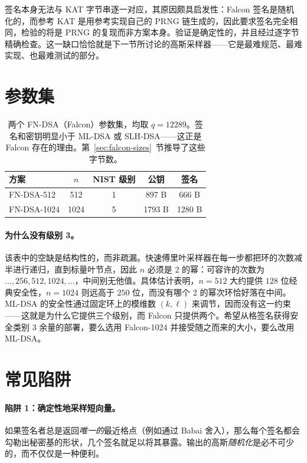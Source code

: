 签名本身无法与 KAT 字节串逐一对应，其原因颇具启发性：Falcon 签名是随机化的，而参考 KAT 是用参考实现自己的 PRNG 链生成的，因此要求签名完全相同，检验的将是 PRNG 的复现而非方案本身。验证是确定性的，并且经过逐字节精确检查。这一缺口恰恰就是下一节所讨论的高斯采样器——它是最难规范、最难实现、也最难测试的部分。

\section{参数集}
\label{sec:falcon-params}

\begin{table}[H]
\centering
\begin{tabular}{lcccc}
\toprule
方案 & $n$ & NIST 级别 & 公钥 & 签名 \\
\midrule
FN-DSA-512  & 512  & 1 & 897 B & 666 B \\
FN-DSA-1024 & 1024 & 5 & 1793 B & 1280 B \\
\bottomrule
\end{tabular}
\caption{两个 FN-DSA（Falcon）参数集，均取 $q=12289$。签名和密钥明显小于 ML-DSA 或 SLH-DSA——这正是 Falcon 存在的理由。第~\ref{sec:falcon-sizes}~节推导了这些字节数。}
\end{table}

\paragraph{为什么没有级别 3。}
该表中的空缺是结构性的，而非疏漏。快速傅里叶采样器在每一步都把环的次数减半进行递归，直到标量叶节点，因此 $n$
必须是 2 的幂：可容许的次数为 $\dots, 256, 512, 1024,
\dots$，中间别无他值。具体估计表明，$n=512$ 大约提供 $128$
位经典安全性，$n=1024$ 则远高于 $250$ 位，而没有哪个 2 的幂次环恰好落在中间。ML-DSA 的安全性通过固定环上的模维数 $(k,\ell)$ 来调节，因而没有这一约束——这就是为什么它提供三个级别，而 Falcon 只提供两个。希望从格签名获得安全类别 3
余量的部署，要么选用 Falcon-1024 并接受随之而来的大小，要么改用 ML-DSA。

\section{常见陷阱}

\paragraph{陷阱 1：确定性地采样短向量。}
如果签名者总是返回\emph{唯一的}最近格点（例如通过 Babai 舍入），那么每个签名都会勾勒出秘密基的形状，几个签名就足以将其暴露。输出的高斯\emph{随机化}是必不可少的，而不仅仅是一种便利。

